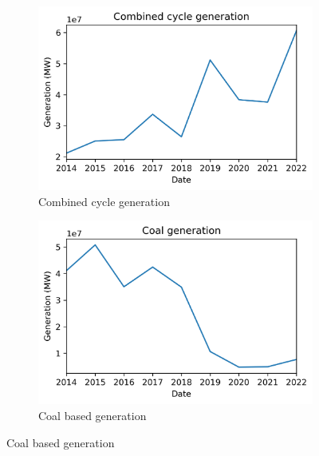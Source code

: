\begin{figure}[H]
\centering
    \begin{subfigure}{.45\textwidth}
        \centering
        \includegraphics[width=1\linewidth]{images/analysis/comb-gen-yearly}
        \caption{Combined cycle generation}
    \end{subfigure}
    \begin{subfigure}{.45\textwidth}
        \centering
        \includegraphics[width=1\linewidth]{images/analysis/coal-gen-yearly}
        \caption{Coal based generation}
    \end{subfigure}
\end{figure}

